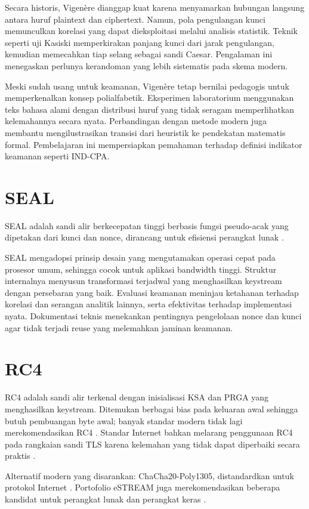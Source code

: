 \documentclass[../main.tex]{subfiles}
\begin{document}
Secara historis, Vigen\`{e}re dianggap kuat karena menyamarkan hubungan langsung antara huruf plaintext dan ciphertext. Namun, pola pengulangan kunci memunculkan korelasi yang dapat dieksploitasi melalui analisis statistik. Teknik seperti uji Kasiski memperkirakan panjang kunci dari jarak pengulangan, kemudian memecahkan tiap selang sebagai sandi Caesar. Pengalaman ini menegaskan perlunya kerandoman yang lebih sistematis pada skema modern.

Meski sudah usang untuk keamanan, Vigen\`{e}re tetap bernilai pedagogis untuk memperkenalkan konsep polialfabetik. Eksperimen laboratorium menggunakan teks bahasa alami dengan distribusi huruf yang tidak seragam memperlihatkan kelemahannya secara nyata. Perbandingan dengan metode modern juga membantu mengilustrasikan transisi dari heuristik ke pendekatan matematis formal. Pembelajaran ini mempersiapkan pemahaman terhadap definisi indikator keamanan seperti IND-CPA.

\section{SEAL}
SEAL adalah sandi alir berkecepatan tinggi berbasis fungsi pseudo-acak yang dipetakan dari kunci dan nonce, dirancang untuk efisiensi perangkat lunak \citep{seal}.

SEAL mengadopsi prinsip desain yang mengutamakan operasi cepat pada prosesor umum, sehingga cocok untuk aplikasi bandwidth tinggi. Struktur internalnya menyusun transformasi terjadwal yang menghasilkan keystream dengan persebaran yang baik. Evaluasi keamanan meninjau ketahanan terhadap korelasi dan serangan analitik lainnya, serta efektivitas terhadap implementasi nyata. Dokumentasi teknis menekankan pentingnya pengelolaan nonce dan kunci agar tidak terjadi reuse yang melemahkan jaminan keamanan.

\section{RC4}
RC4 adalah sandi alir terkenal dengan inisialisasi KSA dan PRGA yang menghasilkan keystream. Ditemukan berbagai bias pada keluaran awal sehingga butuh pembuangan byte awal; banyak standar modern tidak lagi merekomendasikan RC4 \citep{rc4,stallings}. Standar Internet bahkan melarang penggunaan RC4 pada rangkaian sandi TLS karena kelemahan yang tidak dapat diperbaiki secara praktis \citep{rfc7465}.

Alternatif modern yang disarankan: ChaCha20-Poly1305, distandardkan untuk protokol Internet \citep{rfc8439}. Portofolio eSTREAM juga merekomendasikan beberapa kandidat untuk perangkat lunak dan perangkat keras \citep{estream}.
\end{document}
